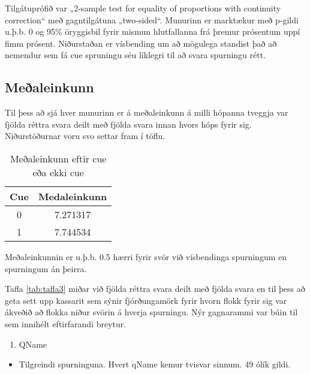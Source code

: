 \documentclass[
  10pt,
]{article}
\providecommand{\tightlist}{%
  \setlength{\itemsep}{0pt}\setlength{\parskip}{0pt}}
\begin{document}
Tilgátuprófið var „2-sample test for equality of proportions with continuity correction`` með gagntilgátuna „two-sided``. Munurinn er marktækur með p-gildi u.þ.b. 0 og 95\% öryggisbil fyrir mismun hlutfallanna frá þremur prósentum uppí fimm prósent.
Niðurstaðan er vísbending um að mögulega standist það að nemendur sem fá cue spruningu séu líklegri til að svara spurningu rétt.

\hypertarget{meuxf0aleinkunn}{%
\subsection{Meðaleinkunn}\label{meuxf0aleinkunn}}

Til þess að sjá hver munurinn er á meðaleinkunn á milli hópanna tveggja var fjölda réttra svara deilt með fjölda svara innan hvors hóps fyrir sig. Niðurstöðurnar voru svo settar fram í töflu.

\begin{table}[!h]

\caption{\label{tab:tafla3}\label{tab:strings} Meðaleinkunn eftir cue eða ekki cue}
\centering
\begin{tabular}[t]{cc}
\toprule
\textbf{Cue} & \textbf{Medaleinkunn}\\
\midrule
0 & 7.271317\\
1 & 7.744534\\
\bottomrule
\end{tabular}
\end{table}

Meðaleinkunnin er u.þ.b. 0.5 hærri fyrir svör við vísbendinga spurningum en spurningum án þeirra.

Tafla \ref{tab:tafla3} miðar við fjölda réttra svara deilt með fjölda svara en til þess að geta sett upp kassarit sem sýnir fjórðungamörk fyrir hvorn flokk fyrir sig var ákveðið að flokka niður svörin á hverja spurningu. Nýr gagnarammi var búin til sem innihélt eftirfarandi breytur.

\newpage

\begin{enumerate}
\def\labelenumi{\arabic{enumi}.}
\tightlist
\item
  QName
\end{enumerate}

\begin{itemize}
\tightlist
\item
  Tilgreindi spurninguna. Hvert qName kemur tvisvar sinnum. 49 ólík gildi.
\end{itemize}
\end{document}
